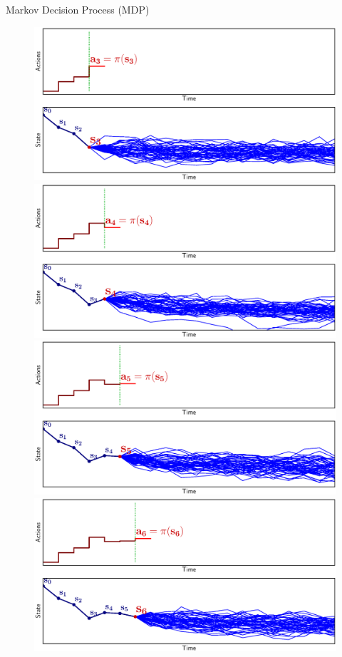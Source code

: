 \documentclass[lecture]{beamer}
\begin{document}
\begin{frame}{\normalsize Markov Decision Process (MDP)}
\begin{overlayarea}{\textwidth}{0.45\textheight}
{\begin{overlayarea}{\textwidth}{1\textheight}
\begin{figure}
{          \includegraphics[width=\FS\textwidth,clip]{Codes/Basics/MDP3.eps}
        }%
        {%
          \includegraphics[width=\FS\textwidth,clip]{Codes/Basics/MDP4.eps}
        }%
        {%
          \includegraphics[width=\FS\textwidth,clip]{Codes/Basics/MDP5.eps}
        }%
        {%
          \includegraphics[width=\FS\textwidth,clip]{Codes/Basics/MDP6.eps}
}
\end{figure}
\end{overlayarea}}
\end{overlayarea}
\end{frame}
\end{document}
